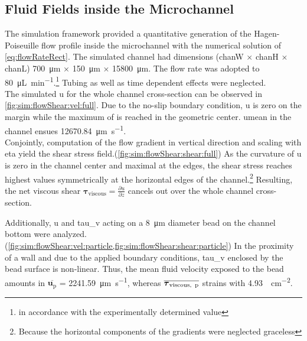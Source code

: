 \subsection{Fluid Fields inside the Microchannel}
\label{sec:res:fluidSim}
The simulation framework provided a quantitative generation of the Hagen-Poiseuille flow profile inside the microchannel with the numerical solution of \cref{eq:flowRateRect}. The simulated channel had dimensions (\gls{chanW} $\times$ \gls{chanH} $\times$ \gls{chanL}) \SI{700}{\micro\meter} $\times$ \SI{150}{\micro\meter} $\times$ \SI{15800}{\micro\meter}. The flow rate was adopted to \SI{80}{\micro\liter\per\minute}.\footnote{in accordance with the experimentally determined value} Tubing as well as time dependent effects were neglected. \\
The simulated \gls{u} for the whole channel cross-section can be observed in \cref{fig:sim:flowShear:vel:full}. Due to the no-slip boundary condition, \gls{u} is zero on the margin while the maximum of is reached in the geometric center. \gls{umean} in the channel ensues \SI{12670.84}{\micro\meter\per\second}.\\
Conjointly, computation of the flow gradient in vertical direction and scaling with \gls{eta} yield the shear stress field.(\cref{fig:sim:flowShear:shear:full}) As the curvature of \gls{u} is zero in the channel center and maximal at the edges, the shear stress reaches highest values symmetrically at the horizontal edges of the channel.\footnote{Because the horizontal components of the gradients were neglected graceless} Resulting, the net viscous shear $\boldsymbol{\tau}_\text{viscous} = \frac{\partial u}{\partial z}$ cancels out over the whole channel cross-section.

Additionally, \gls{u} and \gls{tau_v} acting on a \SI{8}{\micro\meter} diameter bead on the channel bottom were analyzed.(\cref{fig:sim:flowShear:vel:particle,fig:sim:flowShear:shear:particle}) In the proximity of a wall and due to the applied boundary conditions, \gls{tau_v} enclosed by the bead surface is non-linear. Thus, the mean fluid velocity exposed to the bead amounts in $\overline{\mathbf{u}_\text{p}}$ =  \SI{2241.59}{\micro\meter\per\second}, whereas  $\overline{\boldsymbol{\tau}_\text{viscous,\, p}}$ strains with \SI{4.93}{\dyne\per\square\centi\meter}.

